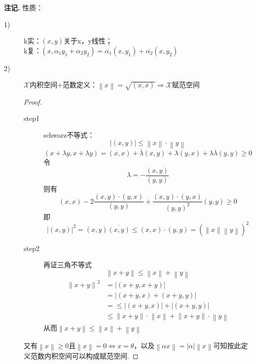 \documentclass[12pt, a4paper, oneside]{ctexbook}
\newenvironment{note}{\par\noindent\textbf{注记. }}{\par}
\begin{document}
\begin{note}
性质：\begin{description}
	\item[1)] k实：$(x,y)$关于x，y线性；\\
	k复：$(x,\alpha_1y_1+\alpha_2y_2)=\overline{\alpha_1}(x,y_1)+\overline{\alpha_2}(x,y_2)$
	\item[2)] $\mathscr{X}$内积空间+范数定义：$\left \| x\right \|=\sqrt{(x,x)} \Rightarrow \mathscr{X}$赋范空间
	\begin{proof}
	\begin{description}
		\item[step1] schwarz不等式：\begin{equation*}
			\left | (x,y)\right |\leqslant \left \| x\right \|\cdot \left \| y\right \|
		\end{equation*}
	\begin{equation*}
		(x+\lambda y,x+\lambda y)=(x,x)+\overline{\lambda }(x,y)+\lambda(y,x)+\lambda \overline{\lambda}(y,y)\geqslant 0
	\end{equation*}
令\begin{equation*}
	\lambda =-\frac{(x,y)}{(y,y)}
\end{equation*}
则有\begin{equation*}
	(x,x)-2\frac{(x,y)\cdot (y,x)}{(y,y)}+\frac{(x,y)\cdot (y,x)}{(y,y)^2}(y,y)\geqslant 0
\end{equation*}
即\begin{equation*}
	\left | (x,y)\right |^2=(x,y)\overline{(x,y)}\leqslant (x,x)\cdot (y,y)=(\left \| x\right \|\left \| y\right \|)^2
\end{equation*}
\item[step2]  再证三角不等式\begin{equation*}
	\left \| x+y\right \|\leqslant \left \| x\right \|+\left \| y\right \|
\end{equation*}
\begin{align*}
	\left \| x+y\right \|^2&=\left | (x+y,x+y)\right |\\
	&=\left | (x+y,x)+(x+y,y)\right |\\
	&=\leqslant \left | (x+y,x)\right |+\left | (x+y,y)\right |\\
	&\leqslant \left \| x+y\right \|\cdot \left \| x\right \|+\left \| x+y\right \|\cdot \left \| y\right \|
\end{align*}
从而$\left \| x+y\right \|\leqslant \left \| x\right \|+\left \| y\right \|$
	\end{description}
又有$\left \| x\right \|\geqslant 0$且$\left \| x\right \|=0\Leftrightarrow x=\theta$，以及$\left \| \alpha x\right \|=\left | \alpha\right |\left \| x\right \|$可知按此定义范数内积空间可以构成赋范空间.

\end{proof}
\end{description}
\end{note}
\end{document}
